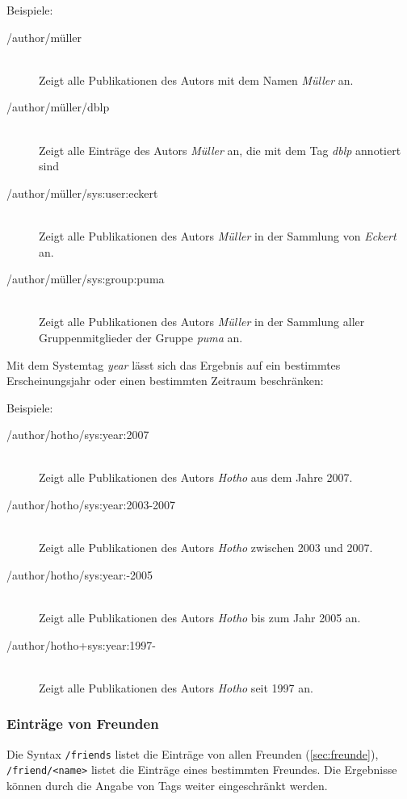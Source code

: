 Beispiele:
\begin{description}
    \item [/author/müller] \hfill \\
    Zeigt alle Publikationen des Autors mit dem Namen \textit{Müller} an.
    \item [/author/müller/dblp] \hfill \\
    Zeigt alle Einträge des Autors \textit{Müller} an, die mit dem Tag \textit{dblp} annotiert sind
    \item [/author/müller/sys:user:eckert] \hfill \\
    Zeigt alle Publikationen des Autors \textit{Müller} in der Sammlung von \textit{Eckert} an.
    \item [/author/müller/sys:group:puma] \hfill \\
    Zeigt alle Publikationen des Autors \textit{Müller} in der Sammlung aller Gruppenmitglieder der Gruppe \textit{puma} an. 
\end{description}

Mit dem Systemtag \textit{year} lässt sich das Ergebnis auf ein bestimmtes Erscheinungsjahr oder einen bestimmten Zeitraum beschränken:%

Beispiele:
\begin{description}
    \item [/author/hotho/sys:year:2007] \hfill \\
    Zeigt alle Publikationen des Autors \textit{Hotho} aus dem Jahre 2007.
    \item [/author/hotho/sys:year:2003-2007] \hfill \\
    Zeigt alle Publikationen des Autors \textit{Hotho} zwischen 2003 und 2007.
    \item [/author/hotho/sys:year:-2005] \hfill \\
    Zeigt alle Publikationen des Autors \textit{Hotho} bis zum Jahr 2005 an.
    \item [/author/hotho+sys:year:1997-] \hfill \\
    Zeigt alle Publikationen des Autors \textit{Hotho} seit 1997 an.
\end{description}

\subsubsection*{Einträge von Freunden} 
\label{sss:vonFreunden}
Die Syntax \texttt{/friends} listet die Einträge von allen Freunden (\autoref{sec:freunde}), \texttt{/friend/<name>} listet die Einträge eines bestimmten Freundes. Die Ergebnisse können durch die Angabe von Tags weiter eingeschränkt werden. 

